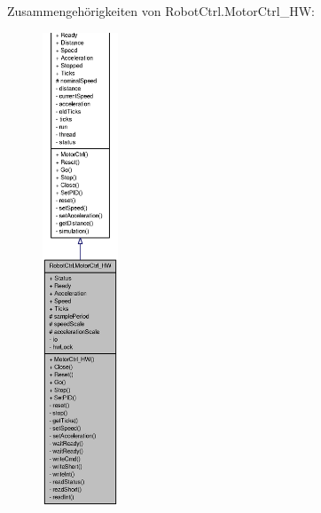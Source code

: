 Zusammengehörigkeiten von RobotCtrl.MotorCtrl\_\-HW:\nopagebreak
\begin{figure}[H]
\begin{center}
\leavevmode
\includegraphics[height=400pt]{class_robot_ctrl_1_1_motor_ctrl___h_w__coll__graph}
\end{center}
\end{figure}
